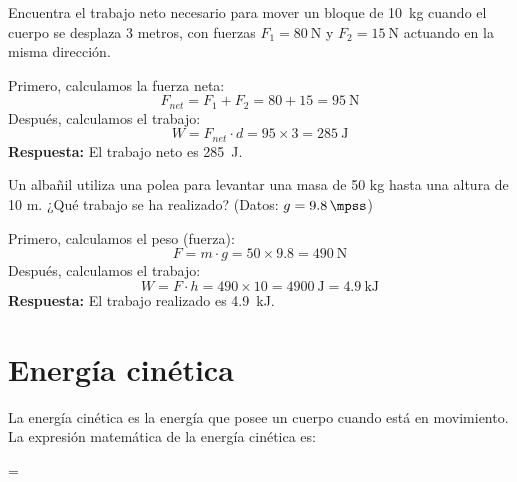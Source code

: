 \begin{exercise}
    Encuentra el trabajo neto necesario para mover un bloque de \qty{10}{\kilo\gram} cuando el cuerpo se desplaza 3 metros, con fuerzas $F_1 = \qty{80}{\newton}$ y $F_2 = \qty{15}{\newton}$ actuando en la misma dirección.
    \begin{solu}
        Primero, calculamos la fuerza neta:
        \[
            F_{net} = F_1 + F_2 = 80 + 15 = \qty{95}{\newton}
        \]
        Después, calculamos el trabajo:
        \[
            W = F_{net} \cdot d = 95 \times 3 = \qty{285}{\joule}
        \]
        \textbf{Respuesta:} El trabajo neto es \qty{285}{\joule}.
    \end{solu}
\end{exercise}

\begin{exercise}
    Un albañil utiliza una polea para levantar una masa de 50 kg hasta una altura de 10 m. ¿Qué trabajo se ha realizado? (Datos: $g = \qty{9.8}{\mpss}$)
    \begin{solu}
        Primero, calculamos el peso (fuerza):
        \[
            F = m \cdot g = 50 \times 9.8 = \qty{490}{\newton}
        \]
        Después, calculamos el trabajo:
        \[
            W = F \cdot h = 490 \times 10 = \qty{4900}{\joule} = \qty{4.9}{\kilo\joule}
        \]
        \textbf{Respuesta:} El trabajo realizado es \qty{4.9}{\kilo\joule}.
    \end{solu}
\end{exercise}


\section{Energía cinética}

La energía cinética es la energía que posee un cuerpo cuando está en movimiento.
La expresión matemática de la energía cinética es:

\vspace{12pt}
\begin{centeredequation}
    =
    \cdot
    \label{eq:energia_cinetica}
\end{centeredequation}
\vspace{12pt}


